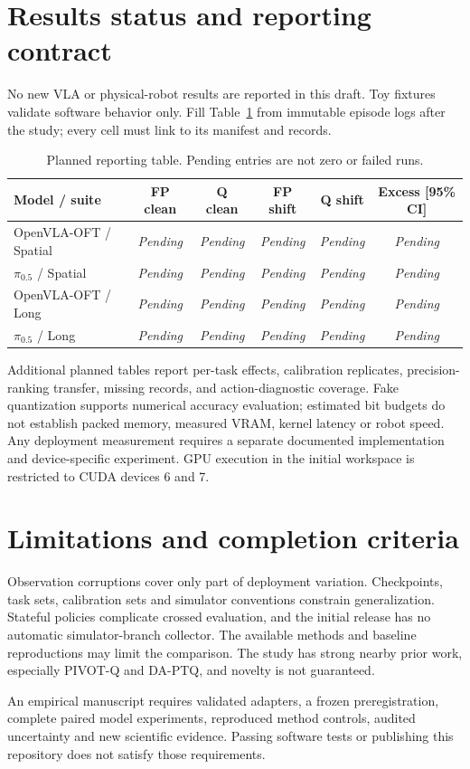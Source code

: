 \documentclass[11pt]{article}
\newcommand{\pending}{\textit{Pending}}
\begin{document}
\section{Results status and reporting contract}
No new VLA or physical-robot results are reported in this draft. Toy fixtures
validate software behavior only. Fill Table~\ref{tab:pending} from immutable
episode logs after the study; every cell must link to its manifest and records.

\begin{table}[ht]
\centering\small
\begin{tabular}{lccccc}
\toprule
Model / suite & FP clean & Q clean & FP shift & Q shift & Excess [95\% CI] \\
\midrule
OpenVLA-OFT / Spatial & \pending & \pending & \pending & \pending & \pending \\
$\pi_{0.5}$ / Spatial & \pending & \pending & \pending & \pending & \pending \\
OpenVLA-OFT / Long & \pending & \pending & \pending & \pending & \pending \\
$\pi_{0.5}$ / Long & \pending & \pending & \pending & \pending & \pending \\
\bottomrule
\end{tabular}
\caption{Planned reporting table. Pending entries are not zero or failed runs.}
\label{tab:pending}
\end{table}

Additional planned tables report per-task effects, calibration replicates,
precision-ranking transfer, missing records, and action-diagnostic coverage.
Fake quantization supports numerical accuracy evaluation; estimated bit budgets
do not establish packed memory, measured VRAM, kernel latency or robot speed.
Any deployment measurement requires a separate documented implementation and
device-specific experiment. GPU execution in the initial workspace is restricted
to CUDA devices 6 and 7.

\section{Limitations and completion criteria}
Observation corruptions cover only part of deployment variation. Checkpoints,
task sets, calibration sets and simulator conventions constrain generalization.
Stateful policies complicate crossed evaluation, and the initial release has no
automatic simulator-branch collector. The available methods and baseline
reproductions may limit the comparison. The study has strong nearby prior work,
especially PIVOT-Q and DA-PTQ, and novelty is not guaranteed.

An empirical manuscript requires validated adapters, a frozen preregistration,
complete paired model experiments, reproduced method controls, audited
uncertainty and new scientific evidence. Passing software tests or publishing
this repository does not satisfy those requirements.



\end{document}
